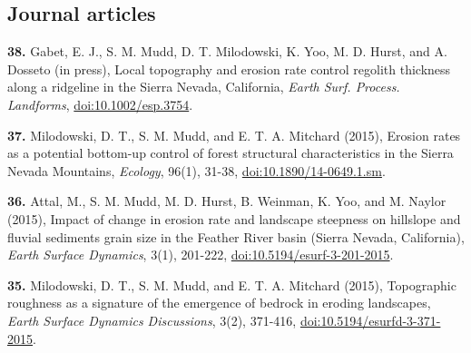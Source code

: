 \documentclass[10pt, a4paper]{article}
\newcommand{\years}[1]{\marginnote{\scriptsize #1}}
\begin{document}
\subsection*{Journal articles}

\raggedright
 

\years{in press}\hangindent=0.7cm\textbf{38.} Gabet, E. J., S. M. Mudd, D. T. Milodowski, K. Yoo, M. D. Hurst, and A. Dosseto (in press), Local topography and erosion rate control regolith thickness along a ridgeline in the Sierra Nevada, California, \textit{Earth Surf. Process. Landforms}, \href{http://dx.doi.org/doi:10.1002/esp.3754}{doi:10.1002/esp.3754}.

\years{2015}\hangindent=0.7cm\textbf{37.} Milodowski, D. T., S. M. Mudd, and E. T. A. Mitchard (2015), Erosion rates as a potential bottom-up control of forest structural characteristics in the Sierra Nevada Mountains, \textit{Ecology}, 96(1), 31-38, \href{http://dx.doi.org/doi:10.1890/14-0649.1.sm}{doi:10.1890/14-0649.1.sm}.\par
\hangindent=0.7cm\textbf{36.} Attal, M., S. M. Mudd, M. D. Hurst, B. Weinman, K. Yoo, and M. Naylor (2015), Impact of change in erosion rate and landscape steepness on hillslope and fluvial sediments grain size in the Feather River basin (Sierra Nevada, California), \textit{Earth Surface Dynamics}, 3(1), 201-222, \href{http://dx.doi.org/doi:10.5194/esurf-3-201-2015}{doi:10.5194/esurf-3-201-2015}.\par
\hangindent=0.7cm\textbf{35.} Milodowski, D. T., S. M. Mudd, and E. T. A. Mitchard (2015), Topographic roughness as a signature of the emergence of bedrock in eroding landscapes, \textit{Earth Surface Dynamics Discussions}, 3(2), 371-416, \href{http://dx.doi.org/doi:10.5194/esurfd-3-371-2015}{doi:10.5194/esurfd-3-371-2015}.\par
\end{document}
